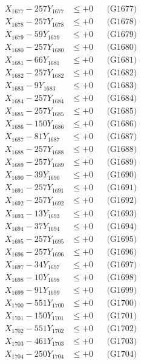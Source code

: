 \documentclass[a4paper,10pt]{article}
\begin{document}
{\begin{align}
X_{1677} - 257Y_{1677} &\leq +0 && \text{(G1677)} \\
X_{1678} - 257Y_{1678} &\leq +0 && \text{(G1678)} \\
X_{1679} - 59Y_{1679} &\leq +0 && \text{(G1679)} \\
X_{1680} - 257Y_{1680} &\leq +0 && \text{(G1680)} \\
\allowbreak
X_{1681} - 66Y_{1681} &\leq +0 && \text{(G1681)} \\
X_{1682} - 257Y_{1682} &\leq +0 && \text{(G1682)} \\
X_{1683} - 9Y_{1683} &\leq +0 && \text{(G1683)} \\
X_{1684} - 257Y_{1684} &\leq +0 && \text{(G1684)} \\
X_{1685} - 257Y_{1685} &\leq +0 && \text{(G1685)} \\
X_{1686} - 150Y_{1686} &\leq +0 && \text{(G1686)} \\
X_{1687} - 81Y_{1687} &\leq +0 && \text{(G1687)} \\
X_{1688} - 257Y_{1688} &\leq +0 && \text{(G1688)} \\
X_{1689} - 257Y_{1689} &\leq +0 && \text{(G1689)} \\
X_{1690} - 39Y_{1690} &\leq +0 && \text{(G1690)} \\
\allowbreak
X_{1691} - 257Y_{1691} &\leq +0 && \text{(G1691)} \\
X_{1692} - 257Y_{1692} &\leq +0 && \text{(G1692)} \\
X_{1693} - 13Y_{1693} &\leq +0 && \text{(G1693)} \\
X_{1694} - 37Y_{1694} &\leq +0 && \text{(G1694)} \\
X_{1695} - 257Y_{1695} &\leq +0 && \text{(G1695)} \\
X_{1696} - 257Y_{1696} &\leq +0 && \text{(G1696)} \\
X_{1697} - 34Y_{1697} &\leq +0 && \text{(G1697)} \\
X_{1698} - 10Y_{1698} &\leq +0 && \text{(G1698)} \\
X_{1699} - 91Y_{1699} &\leq +0 && \text{(G1699)} \\
X_{1700} - 551Y_{1700} &\leq +0 && \text{(G1700)} \\
\allowbreak
X_{1701} - 150Y_{1701} &\leq +0 && \text{(G1701)} \\
X_{1702} - 551Y_{1702} &\leq +0 && \text{(G1702)} \\
X_{1703} - 461Y_{1703} &\leq +0 && \text{(G1703)} \\
X_{1704} - 250Y_{1704} &\leq +0 && \text{(G1704)} \\

\end{align}}
\end{document}
